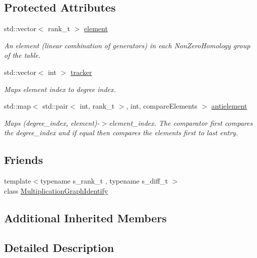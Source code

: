 \subsection*{Protected Attributes}
\begin{DoxyCompactItemize}
\item 
std\+::vector$<$ rank\+\_\+t $>$ \hyperlink{classMackey_1_1MultiplicationGraph_a53fe65317d8cef485a93e3e516dd374f}{element}
\begin{DoxyCompactList}\small\item\em An element (linear combination of generators) in each Non\+Zero\+Homology group of the table. \end{DoxyCompactList}\item 
std\+::vector$<$ int $>$ \hyperlink{classMackey_1_1MultiplicationGraph_ac831b81d1936c4dd2202dabaa8e4e2fb}{tracker}
\begin{DoxyCompactList}\small\item\em Maps element index to degree index. \end{DoxyCompactList}\item 
std\+::map$<$ std\+::pair$<$ int, rank\+\_\+t $>$, int, compare\+Elements $>$ \hyperlink{classMackey_1_1MultiplicationGraph_a8a0d1354d01f29d4388142aab0248389}{antielement}
\begin{DoxyCompactList}\small\item\em Maps (degree\+\_\+index, element)-\/$>$element\+\_\+index. The comparator first compares the degree\+\_\+index and if equal then compares the elements first to last entry. \end{DoxyCompactList}\end{DoxyCompactItemize}
\subsection*{Friends}
\begin{DoxyCompactItemize}
\item 
{\footnotesize template$<$typename s\+\_\+rank\+\_\+t , typename s\+\_\+diff\+\_\+t $>$ }\\class \hyperlink{classMackey_1_1MultiplicationGraph_a3c44ae70fe9249e9662ab525f97dc1db}{Multiplication\+Graph\+Identify}
\end{DoxyCompactItemize}
\subsection*{Additional Inherited Members}


\subsection{Detailed Description}
